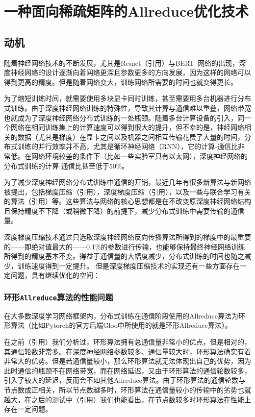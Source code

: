 \chapter{一种面向稀疏矩阵的Allreduce优化技术}
\label{chap3}

\section{动机}

随着神经网络技术的不断发展，尤其是Resnet（引用）与BERT~\cite{devlin2018bert}网络的出现，深度神经网络的设计逐渐向着网络更深且参数更多的方向发展，因为这样的网络可以得到更高的精度。但是随着网络变大，训练网络所需要的时间也就变得更长。

为了缩短训练时间，就需要使用多块显卡同时训练，甚至需要用多台机器进行分布式训练。由于深度神经网络训练的特殊性，导致其计算与通信难以重叠，网络带宽也就成为了深度神经网络分布式训练的一处瓶颈。随着多台计算设备的引入，同一个网络在相同训练集上的计算速度可以得到很大的提升，但不幸的是，神经网络相关的数据（尤其是梯度）在显卡之间以及机器之间相互传输花费了大量的时间，分布式训练的并行效率并不高，尤其是循环神经网络（RNN），它的计算-通信比非常低。在网络环境较差的条件下（比如一些实验室只有以太网），深度神经网络的分布式训练的计算-通信比甚至低于50\%。

为了减少深度神经网络分布式训练中通信的开销，最近几年有很多新算法与新网络被提出，包括梯度压缩（引用），深度梯度压缩（引用），以及一些与联合学习有关的算法（引用）等。这些算法与网络的核心思想都是在不改变原深度神经网络结构且保持精度不下降（或稍微下降）的前提下，减少分布式训练中需要传输的通信量。

深度梯度压缩技术通过只选取深度神经网络反向传播算法所得到的梯度中的最重要的——即绝对值最大的——0.1\%的参数进行传输，也能够保持最终神经网络训练所得到的精度基本不变。得益于通信量的大幅度减少，分布式训练的时间也随之减少，训练速度得到一定提升。
但是深度梯度压缩技术的实现还有一些方面存在一定问题，具有继续优化的空间：

\subsection{环形\texttt{Allreduce}算法的性能问题}
  在大多数深度学习网络框架内，分布式训练在通信阶段使用的Allreduce算法为环形算法（比如Pytorch的官方后端Gloo中所使用的就是环形Allreduce算法）。
  
  在之前（引用）我们分析过，环形算法拥有总通信量非常小的优点，但是相对的，其通信轮数非常多。在深度神经网络参数较多、通信量较大时，环形算法确实有着非常大的优势。但是若通信量较小，那么环形算法就无法体现出自己的优势，因为此时通信的瓶颈不在网络带宽，而在网络延迟，又由于环形算法的通信轮数较多，引入了较大的延迟，反而会不如其他Allreduce算法。由于环形算法的通信轮数与节点数成正相关，所以节点数越多时，环形算法在通信量较小的传输中的劣势也就越大，在之后的测试中（引用）我们也能看出，在节点数较多时环形算法在性能上存在一定问题。
  
